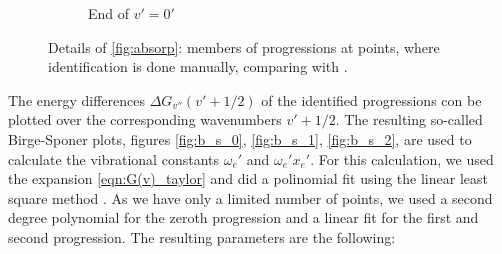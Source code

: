 \begin{figure}
\begin{subfigure}[b]{\mpltw}
        \caption{End of $v'=0'$}
        \label{fig:absorp_detail_03}
    \end{subfigure}
    \caption{Details of \ref{fig:absorp}: members of progressions at points, where 
    identification is done manually, comparing with \cite{staatsexamen}.
    }
    \label{fig:absorp_detail}
\end{figure}

The energy differences $\Delta G_{v''}(v' + 1/2)$ of the identified progressions con 
be plotted over the corresponding wavenumbers $v' + 1/2$. The resulting so-called 
Birge-Sponer plots, figures 
\ref{fig:b_s_0}, \ref{fig:b_s_1}, \ref{fig:b_s_2}, 
are used to calculate the vibrational constants $\omega_e'$ and $\omega_e' x_e'$. 
For this calculation, we used the expansion \eqref{eqn:G(v)_taylor} and did a 
polinomial fit using the linear least square method \cite{cowan1998statistical}. 
As we have only a limited number of points, we used a second degree polynomial
for the zeroth progression and a linear fit for the first and second progression. 
The resulting parameters are the following:

